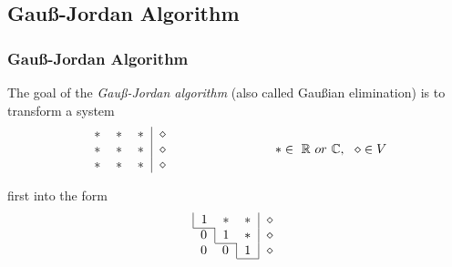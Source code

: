 \documentclass[12pt, t]{beamer}
\renewcommand{\emph}[1]{{\color{Turquoise3}\textsl{#1}}}
\newcommand{\C}{\mathbb{C}} \newcommand{\F}{\mathbb{F}} \newcommand{\R}{\mathbb{R}} \newcommand{\Q}{\mathbb{Q}}
\begin{document}
\subsection{Gau\ss-Jordan Algorithm}
\begin{frame}
    \frametitle{Gau\ss-Jordan Algorithm}
    The goal of the \emph{Gau\ss-Jordan algorithm} (also called Gau\ss ian elimination) is to transform a system
    \begin{equation*}
        \begin{tabular}{ccc|c}
            $\ast$ & $\ast$ & $\ast$ & $\diamond$ \\
            $\ast$ & $\ast$ & $\ast$ & $\diamond$ \\
            $\ast$ & $\ast$ & $\ast$ & $\diamond$ \\
        \end{tabular}
        \qquad\qquad\qquad\qquad
        \ast\in~\R~or~\C,~~\diamond\in V
    \end{equation*}

    first into the form \\
    \begin{equation}
        \begin{array}{c}
            \begin{tabular}{|ccc|c}
                1 & $\ast$ & $\ast$ & $\diamond$ \\ \cline{1-1}
            \end{tabular} \\
            \begin{tabular}{c|cc|c}
                0 & $1$ & $\ast$ & $\diamond$ \\ \cline{2-2}
            \end{tabular} \\
            \begin{tabular}{cc|c|c}
                0 & $0$ & $1$ & $\diamond$ \\
                \cline{3-3}
            \end{tabular}
        \end{array}
    \end{equation}


\end{frame}
\end{document}
